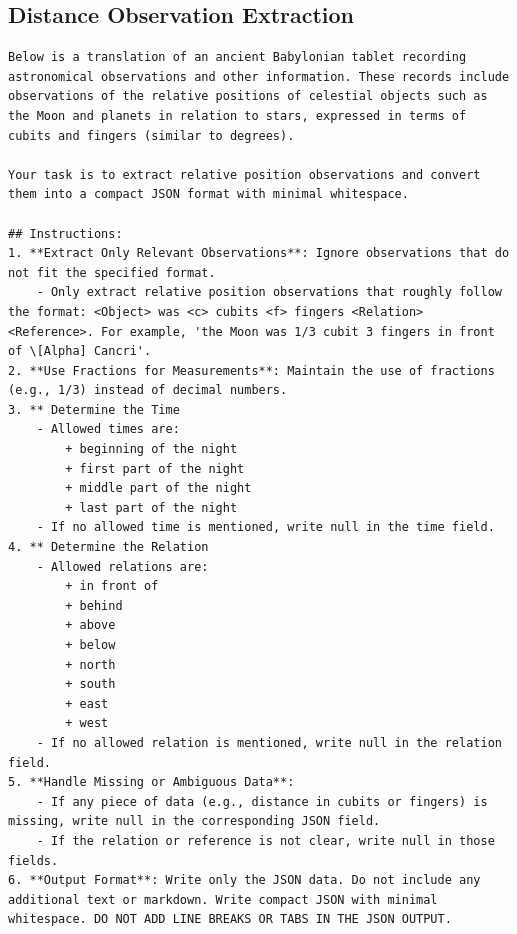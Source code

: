 \documentclass{article}
\begin{document}
\subsection{Distance Observation Extraction}
\begin{lstlisting}
Below is a translation of an ancient Babylonian tablet recording astronomical observations and other information. These records include observations of the relative positions of celestial objects such as the Moon and planets in relation to stars, expressed in terms of cubits and fingers (similar to degrees).

Your task is to extract relative position observations and convert them into a compact JSON format with minimal whitespace.

## Instructions:
1. **Extract Only Relevant Observations**: Ignore observations that do not fit the specified format.
	- Only extract relative position observations that roughly follow the format: <Object> was <c> cubits <f> fingers <Relation> <Reference>. For example, 'the Moon was 1/3 cubit 3 fingers in front of \[Alpha] Cancri'.
2. **Use Fractions for Measurements**: Maintain the use of fractions (e.g., 1/3) instead of decimal numbers.
3. ** Determine the Time
	- Allowed times are:
		+ beginning of the night
		+ first part of the night
		+ middle part of the night
		+ last part of the night
	- If no allowed time is mentioned, write null in the time field.
4. ** Determine the Relation
	- Allowed relations are:
		+ in front of
		+ behind
		+ above
		+ below
		+ north
		+ south
		+ east
		+ west
	- If no allowed relation is mentioned, write null in the relation field.
5. **Handle Missing or Ambiguous Data**: 
	- If any piece of data (e.g., distance in cubits or fingers) is missing, write null in the corresponding JSON field.
	- If the relation or reference is not clear, write null in those fields.
6. **Output Format**: Write only the JSON data. Do not include any additional text or markdown. Write compact JSON with minimal whitespace. DO NOT ADD LINE BREAKS OR TABS IN THE JSON OUTPUT.
\end{lstlisting}
\end{document}
